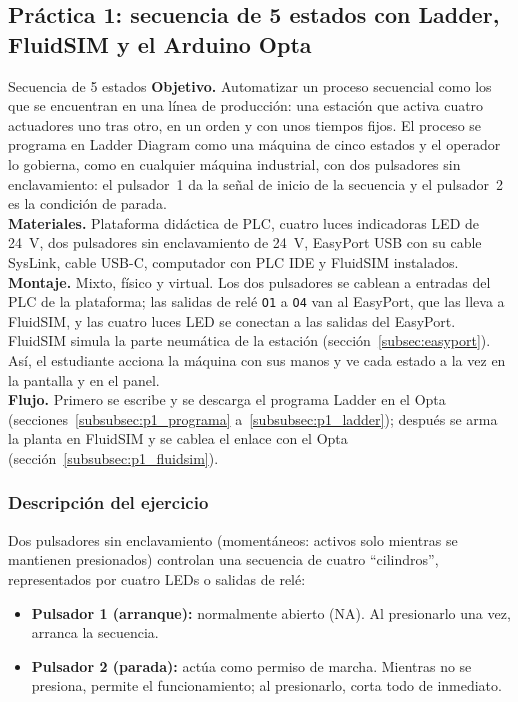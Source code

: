\documentclass[12pt,a4paper]{article}
\begin{document}
\subsection[Práctica 1: secuencia de 5 estados]{Práctica 1: secuencia de 5 estados con Ladder, FluidSIM y el Arduino Opta}
\label{subsec:practica1}

\begin{practica}{Secuencia de 5 estados}
\textbf{Objetivo.} Automatizar un proceso secuencial como los que se
encuentran en una línea de producción: una estación que activa cuatro
actuadores uno tras otro, en un orden y con unos tiempos fijos. El proceso
se programa en Ladder Diagram como una máquina de cinco estados y el
operador lo gobierna, como en cualquier máquina industrial, con dos
pulsadores sin enclavamiento: el pulsador~1 da la señal de inicio de la
secuencia y el pulsador~2 es la condición de parada.\\
\textbf{Materiales.} Plataforma didáctica de PLC, cuatro luces indicadoras
LED de 24~V, dos pulsadores sin enclavamiento de 24~V, EasyPort USB con su
cable SysLink, cable USB-C, computador con PLC IDE y FluidSIM
instalados.\\
\textbf{Montaje.} Mixto, físico y virtual. Los dos pulsadores se cablean
a entradas del PLC de la plataforma; las salidas de relé \texttt{O1} a
\texttt{O4} van al EasyPort, que las lleva a FluidSIM, y las cuatro luces
LED se conectan a las salidas del EasyPort. FluidSIM simula la parte
neumática de la estación (sección~\ref{subsec:easyport}). Así, el estudiante acciona la máquina con
sus manos y ve cada estado a la vez en la pantalla y en el panel.\\
\textbf{Flujo.} Primero se escribe y se descarga el programa Ladder en el
Opta (secciones~\ref{subsubsec:p1_programa}
a~\ref{subsubsec:p1_ladder}); después se arma la planta en FluidSIM y se
cablea el enlace con el Opta (sección~\ref{subsubsec:p1_fluidsim}).
\end{practica}

\subsubsection{Descripción del ejercicio}

Dos pulsadores sin enclavamiento (momentáneos: activos solo mientras se
mantienen presionados) controlan una secuencia de cuatro ``cilindros'',
representados por cuatro LEDs o salidas de relé:

\begin{itemize}
    \item \textbf{Pulsador 1 (arranque):} normalmente abierto (NA). Al
    presionarlo una vez, arranca la secuencia.
    \item \textbf{Pulsador 2 (parada):} actúa como permiso de marcha.
    Mientras no se presiona, permite el funcionamiento; al presionarlo,
    corta todo de inmediato.
\end{itemize}
\end{document}
